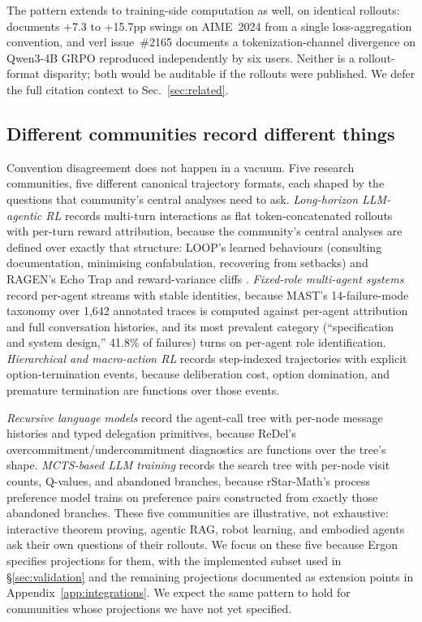 \documentclass{article}
\begin{document}
The pattern extends to training-side computation as well, on
identical rollouts: \citet{liu2025drgrpo} documents +7.3 to
+15.7pp swings on AIME~2024 from a single loss-aggregation
convention, and verl issue~\#2165 \citep{verl2165} documents a
tokenization-channel divergence on Qwen3-4B GRPO reproduced
independently by six users. Neither is a rollout-format
disparity; both would be auditable if the rollouts were
published. We defer the full citation context to
Sec.~\ref{sec:related}.

\subsection{Different communities record different things}
\label{sec:problem:communities}

Convention disagreement does not happen in a vacuum. Five
research communities, five different canonical trajectory
formats, each shaped by the questions that community's central
analyses need to ask. \emph{Long-horizon LLM-agentic
RL} records multi-turn interactions as flat token-concatenated
rollouts with per-turn reward attribution, because the
community's central analyses are defined over exactly that
structure: LOOP's learned behaviours (consulting documentation,
minimising confabulation, recovering from setbacks)
\citep{chen2025loop} and RAGEN's Echo Trap and reward-variance
cliffs \citep{wang2025ragen}. \emph{Fixed-role multi-agent
systems} record per-agent streams with stable identities,
because MAST's 14-failure-mode taxonomy over 1{,}642 annotated
traces \citep{cemri2025mast} is computed against per-agent
attribution and full conversation histories, and its most
prevalent category (``specification and system design,''
41.8\% of failures) turns on per-agent role identification.
\emph{Hierarchical and macro-action RL} records step-indexed
trajectories with explicit option-termination events, because
deliberation cost, option domination, and premature
termination \citep{bacon2017optioncritic} are functions over
those events.

\emph{Recursive language models} record the agent-call tree
with per-node message histories and typed delegation
primitives, because ReDel's overcommitment/undercommitment
diagnostics \citep{zhu2024redel} are functions over the tree's
shape. \emph{MCTS-based LLM training} records the search tree
with per-node visit counts, Q-values, and abandoned branches,
because rStar-Math's process preference model
\citep{rstarmath2025} trains on preference pairs constructed
from exactly those abandoned branches. These five communities
are illustrative, not exhaustive: interactive theorem proving,
agentic RAG, robot learning, and embodied agents ask their own
questions of their rollouts. We focus on these five because
Ergon specifies projections for them, with the implemented
subset used in \S\ref{sec:validation} and the remaining
projections documented as extension points in
Appendix~\ref{app:integrations}. We expect the same pattern to
hold for communities whose projections we have not yet specified.
\end{document}
